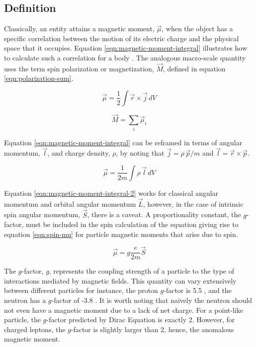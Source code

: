 \subsection{Definition}
Classically, an entity attains a magnetic moment, $\vec{\mu}$, when the object has a specific correlation between the motion of its electric charge and the physical space that it occupies.  Equation \ref{eqn:magnetic-moment-integral} illustrates how to calculate such a correlation for a body \cite{jackson}.  The analogous macro-scale quantity uses the term spin polarization or magnetization, $\vec{M}$, defined in equation \ref{eqn:polarization-sum}.

\begin{equation}
\label{eqn:magnetic-moment-integral}
\vec{\mu} = \frac{1}{2} \int \vec{r} \times \vec{j} \,dV
\end{equation}

\begin{equation}
\label{eqn:polarization-sum}
\vec{M} = \sum_i \vec{\mu}_i
\end{equation}

\noindent
Equation \ref{eqn:magnetic-moment-integral} can be reframed in terms of angular momentum, $\vec{l}$, and charge density, $\rho$, by noting that $\vec{j} = \rho \, \vec{p}/m$ and $\vec{l} = \vec{r} \times \vec{p}$.

\begin{equation}
\label{eqn:magnetic-moment-integral-2}
\vec{\mu} = \frac{1}{2 m} \int \rho \, \vec{l} \,dV
\end{equation}

Equation \ref{eqn:magnetic-moment-integral-2} works for classical angular momentum and orbital angular momentum $\vec{L}$, however, in the case of intrinsic spin angular momentum, $\vec{S}$, there is a caveat.  A proportionality constant, the $g$-factor, must be included in the spin calculation of the equation giving rise to equation \ref{eqn:spin-mu} for particle magnetic moments that arise due to spin.

\begin{equation}
\label{eqn:spin-mu}
\vec{\mu} = g \frac{e}{2 m}\vec{S}
\end{equation}

\noindent
The $g$-factor, $g$, represents the coupling strength of a particle to the type of interactions mediated by magnetic fields.  This quantity can vary extensively between different particles for instance, the proton $g$-factor is 5.5 \cite{codata}, and the neutron has a $g$-factor of -3.8 \cite{codata}.  It is worth noting that naively the neutron should not even have a magnetic moment due to a lack of net charge.  For a point-like particle, the $g$-factor predicted by Dirac Equation is exactly 2.  However, for charged leptons, the $g$-factor is slightly larger than 2, hence, the anomalous magnetic moment.

